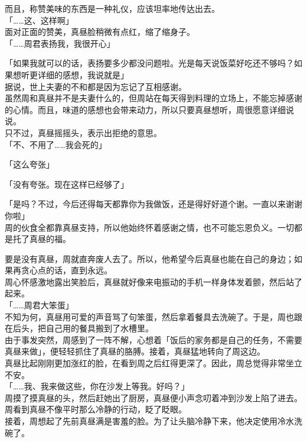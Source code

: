而且，称赞美味的东西是一种礼仪，应该坦率地传达出去。\\

「……这、这样啊」\\

面对正面的赞美，真昼脸稍微有点红，缩了缩身子。\\

「……周君表扬我，我很开心」

「如果我就可以的话，表扬要多少都没问题啦。光是每天说饭菜好吃还不够吗？如果想听更详细的感想，我说就是」\\

据说，世上夫妻的不和都是因为忘记了互相感谢。\\

虽然周和真昼并不是夫妻什么的，但周站在每天得到料理的立场上，不能忘掉感谢的心情。而且，味道的感想也会带来动力，所以只要真昼想听，周很愿意详细说说。\\

只不过，真昼摇摇头，表示出拒绝的意思。\\

「不、不用了……我会死的」

「这么夸张」

「没有夸张。现在这样已经够了」

「是吗？不过，今后还得每天都靠你为我做饭，还是得好好道个谢。一直以来谢谢你啦」\\

周的伙食全都靠真昼支持，所以他始终怀着感谢之情，也不可能忘恩负义。一切都是托了真昼的福。

要是没有真昼，周就直奔废人去了。所以，他希望今后真昼也能在自己的身边；如果再贪心点的话，直到永远。\\

周心怀感激地露出笑脸后，真昼就好像来电振动的手机一样身体发着颤，然后站了起来。\\

「……周君大笨蛋」\\

不知为何，真昼用可爱的声音骂了句笨蛋，然后拿着餐具去洗碗了。于是，周也跟在后头，把自己用的餐具搬到了水槽里。\\

由于事发突然，周感到了一阵不解，心想着「饭后的家务都是自己的任务，不需要真昼来做」，便轻轻抓住了真昼的胳膊。接着，真昼猛地转向了周这边。\\

真昼比起刚刚更加涨红的脸，在看到周之后红得更深了。因此，周总觉得非常坐立不安。\\

「……我、我来做这些，你在沙发上等我。好吗？」\\

周摸了摸真昼的头，然后赶她出了厨房，真昼便小声念叨着冲到沙发上陷了进去。\\

周看到真昼不像平时那么冷静的行动，眨了眨眼。\\

接着，周想起了先前真昼满是害羞的脸。为了让头脑冷静下来，他决定使用冷水洗碗了。
